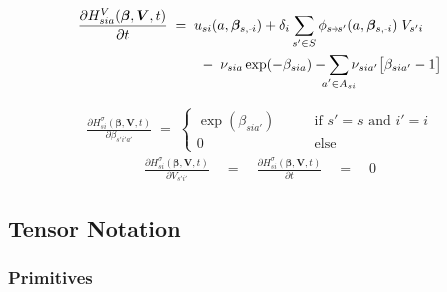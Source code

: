\documentclass[11pt,fleqn]{article}
\newcommand{\bbeta}{\bm{\beta}}
\newcommand{\bV}{\bm{V}}
\newcommand{\shortminus}{{\text{\scalebox{0.4}[1.0]{\(-\)}}}}
\newcommand{\minusi}{\shortminus i}
\newcommand{\shortrightarrow}{\parbox{4pt}{\tikz{\draw[->](0,0)--(4pt,0);}}}
\newcommand{\phiss}{\phi_{s\shortrightarrow s'}}
\begin{document}
\begin{align*}
	\frac{\partial H^V_{sia}(\bbeta,\bV,t) }{ \partial t } & \;=\; 
		u_{si}(a,\bbeta_{s,\minusi}) + \delta_i \sum\limits_{s'\in S} \phiss(a,\bbeta_{s,\minusi}) \; V_{s'i} \\
		& \qquad \;-\; \nu_{sia}\exp(-\beta_{sia}) - \sum\limits_{\mathclap{a'\in A_{si}}} \nu_{sia'} \bigl[ \beta_{sia'} - 1 \bigr]
\end{align*}

\begin{align*}
	\frac{ \partial H^\sigma_{si}(\bbeta,\bV,t) }{ \partial \beta_{s'i'a'}} \;=\; 
		\begin{cases}
			\exp(\beta_{sia'}) \qquad&\text{if } s'=s \text{ and } i'=i \\
			0 \qquad&\text{else}  
		\end{cases}
\end{align*}
\begin{align*}
	\frac{ \partial H^\sigma_{si}(\bbeta,\bV,t) }{ \partial V_{s'i'} } \quad=\quad \frac{ \partial H^\sigma_{si}(\bbeta,\bV,t) }{ \partial t } \quad=\quad 0
\end{align*}




\subsection*{Tensor Notation}


\subsubsection*{Primitives}
\end{document}
